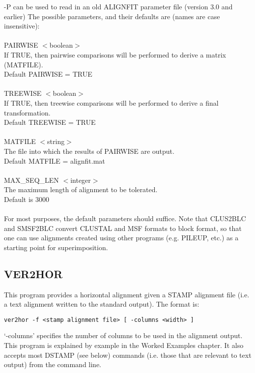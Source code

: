 -P can be used to read in an old ALIGNFIT parameter file (version 3.0 and earlier)
The possible parameters, and their defaults are (names are case 
insensitive):\\
\\
PAIRWISE $<$boolean$>$\\
If TRUE, then pairwise comparisons will be performed to derive a
matrix (MATFILE).\\
Default PAIRWISE = TRUE\\
\\
TREEWISE $<$boolean$>$\\
If TRUE, then treewise comparisons will be performed to derive a
final transformation.\\
Default TREEWISE = TRUE\\
\\
MATFILE $<$string$>$\\
The file into which the results of PAIRWISE are output.\\
Default MATFILE = alignfit.mat\\
\\
MAX\_SEQ\_LEN $<$integer$>$\\
The maximum length of alignment to be tolerated.\\
Default is 3000\\
\\
For most purposes, the default parameters should suffice.  Note that CLUS2BLC and SMSF2BLC
convert CLUSTAL and MSF formats to block format, so that one can use alignments created
using other programs (e.g. PILEUP, etc.) as a starting point for superimposition.


\subsection{VER2HOR}

This program provides a horizontal alignment given a STAMP alignment file
(i.e. a text alignment written to the standard output).  The format is:

\begin{scriptsize}\begin{verbatim}
ver2hor -f <stamp alignment file> [ -columns <width> ]
\end{verbatim} \end{scriptsize}

`-columns' specifies the number of columns to be used in the alignment output.  This
program is explained by example in the Worked Examples chapter.  It also accepts 
most DSTAMP (see below) commands (i.e. those that are relevant to text output) from
the command line.


